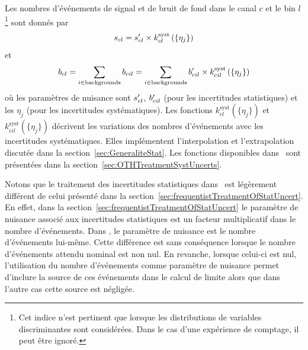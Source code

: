 Les nombres d'\'ev\'enements de signal et de bruit de fond dans le canal $c$ et le bin $l$\footnote{Cet indice n'est pertinent que lorsque les distributions de variables discriminantes sont consid\'er\'ees. Dans le cas d'une exp\'erience de comptage, il peut \^etre ignor\'e.} sont donn\'es par 
\begin{equation}
\label{eq:sigYieldOTH}
\scck=\scck'\times k_{cl}^{\text{syst}}\left(\{\eta_j\}\right)
\end{equation}
et 
\begin{equation}
\label{eq:bkgYieldOTH}
\bck=\sum\limits_{i\in\text{backgrounds}}\bcik=\sum\limits_{i\in\text{backgrounds}}\bcik'\times k_{cil}^{\text{syst}}\left(\{\eta_j\}\right)
\end{equation}
o\`u les param\`etres de nuisance sont $s_{cl}'$, $b_{cil}'$ (pour les incertitudes statistiques) et les $\eta_j$ (pour les incertitudes syst\'ematiques). Les fonctions $k_{cl}^{\text{syst}}\left(\{\eta_j\}\right)$ et $k_{cil}^{\text{syst}}\left(\{\eta_j\}\right)$ d\'ecrivent les variations des nombres d'\'ev\'enements avec les incertitudes syst\'ematiques. Elles impl\'ementent l'interpolation et l'extrapolation discut\'ee dans la section~\ref{sec:GeneraliteStat}. Les fonctions disponibles dans \opthylic~sont pr\'esent\'ees dans la section~\ref{sec:OTHTreatmentSystUncerts}.

Notons que le traitement des incertitudes statistiques dans \opthylic~est l\'eg\`erement diff\'erent de celui pr\'esent\'e dans la section~\ref{sec:frequentistTreatmentOfStatUncert}. En effet, dans la section~\ref{sec:frequentistTreatmentOfStatUncert} le param\`etre de nuisance associ\'e aux incertitudes statistiques est un facteur multiplicatif dans le nombre d'\'ev\'enements. Dans \opthylic, le param\`etre de nuisance est le nombre d'\'ev\'enements lui-m\^eme. Cette diff\'erence est sans cons\'equence lorsque le nombre d'\'ev\'enements attendu nominal est non nul. En revanche, lorsque celui-ci est nul, l'utilisation du nombre d'\'ev\'enements comme param\`etre de nuisance permet d'inclure la source de ces \'ev\'enements dans le calcul de limite alors que dans l'autre cas cette source est n\'eglig\'ee.

